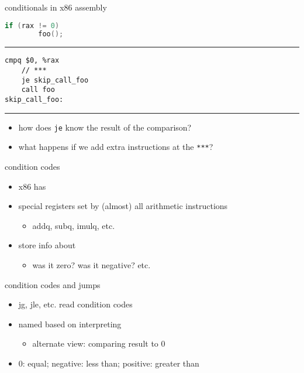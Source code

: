 \begin{frame}[fragile,label=x86IfExample]{conditionals in x86 assembly}
\begin{lstlisting}[language=C++]
    if (rax != 0)
        foo();
\end{lstlisting}
\hrule
\begin{lstlisting}[language=myasm]
    cmpq $0, %rax
    // ***
    je skip_call_foo
    call foo
skip_call_foo:
\end{lstlisting}
\hrule
\begin{itemize}
\item how does \texttt{je} know the result of the comparison?
\item what happens if we add extra instructions at the \texttt{***}?
\end{itemize}
\end{frame}

\begin{frame}{condition codes}
\begin{itemize}
\item x86 has 
\item special registers set by (almost) all arithmetic instructions
    \begin{itemize}
    \item addq, subq, imulq, etc.
    \end{itemize}
\item store info about 
    \begin{itemize}
    \item was it zero? was it negative? etc.
    \end{itemize}
\end{itemize}
\end{frame}

\begin{frame}{condition codes and jumps}
\begin{itemize}
\item {\keywordstyle jg}, {\keywordstyle jle}, etc. read condition codes
\item named based on interpreting 
    \begin{itemize}
    \item alternate view: comparing result to 0
    \end{itemize}
\item 0: equal; negative: less than; positive: greater than
\end{itemize}
\end{frame}


